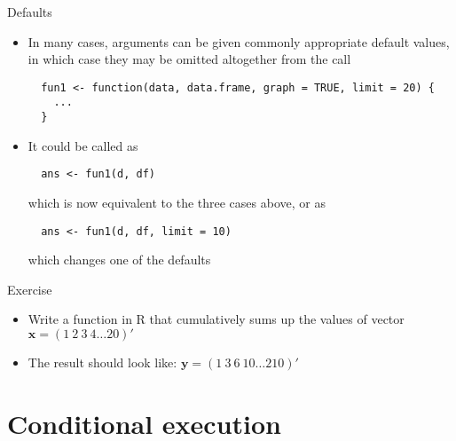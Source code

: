 \documentclass[aspectratio=169]{beamer}
\begin{document}
\begin{frame}[fragile]{Defaults}
  \begin{itemize}
    \item In many cases, arguments can be given commonly appropriate
      default values, in which case they may be omitted altogether from the
      call

\begin{lstlisting}
  fun1 <- function(data, data.frame, graph = TRUE, limit = 20) {
    ...
  }
\end{lstlisting}

    \item It could be called as

\begin{lstlisting}
  ans <- fun1(d, df)
\end{lstlisting}

which is now equivalent to the three cases above, or as

\begin{lstlisting}
  ans <- fun1(d, df, limit = 10)
\end{lstlisting}

which changes one of the defaults
  \end{itemize}
\end{frame}

\begin{frame}{}
  \begin{block}{Exercise}
  \begin{itemize}
    \item Write a function in R that cumulatively sums up the values of
      vector $\mathbf{x} = (1~2~3~4 \dots 20)'$
    \item The result should look like: $\mathbf{y} = (1~3~6~10 \dots 210)'$
  \end{itemize}
  \end{block}
\end{frame}

\section[if/else]{Conditional execution}
\end{document}
